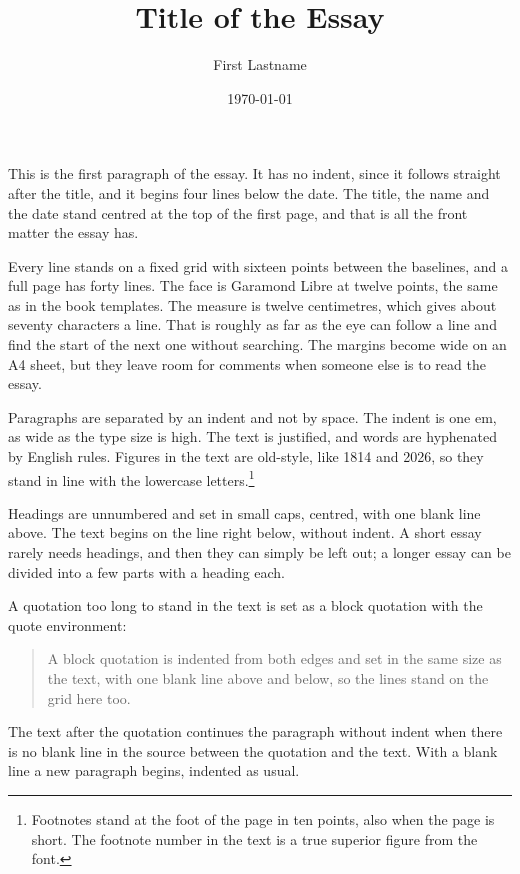 \documentclass[12pt]{article}
\title{Title of the Essay}
\author{First Lastname}
\date{\today}
\begin{document}
\maketitle


%

This is the first paragraph of the essay. It has no indent, since it follows straight after the title, and it begins four lines below the date. The title, the name and the date stand centred at the top of the first page, and that is all the front matter the essay has.

Every line stands on a fixed grid with sixteen points between the baselines, and a full page has forty lines. The face is Garamond Libre at twelve points, the same as in the book templates. The measure is twelve centimetres, which gives about seventy characters a line. That is roughly as far as the eye can follow a line and find the start of the next one without searching. The margins become wide on an A4 sheet, but they leave room for comments when someone else is to read the essay.

Paragraphs are separated by an indent and not by space. The indent is one em, as wide as the type size is high. The text is justified, and words are hyphenated by English rules. Figures in the text are old-style, like 1814 and 2026, so they stand in line with the lowercase letters.\footnote{Footnotes stand at the foot of the page in ten points, also when the page is short. The footnote number in the text is a true superior figure from the font.}


Headings are unnumbered and set in small caps, centred, with one blank line above. The text begins on the line right below, without indent. A short essay rarely needs headings, and then they can simply be left out; a longer essay can be divided into a few parts with a heading each.

A quotation too long to stand in the text is set as a block quotation with the quote environment:

\begin{quote}
A block quotation is indented from both edges and set in the same size as the text, with one blank line above and below, so the lines stand on the grid here too.
\end{quote}
The text after the quotation continues the paragraph without indent when there is no blank line in the source between the quotation and the text. With a blank line a new paragraph begins, indented as usual.
\end{document}

